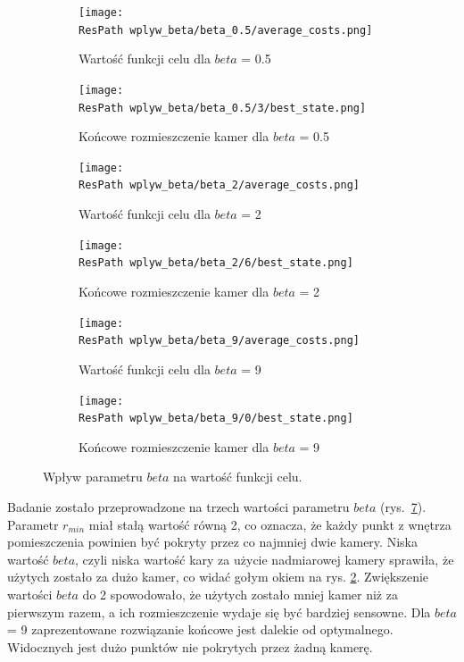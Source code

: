 \documentclass[12pt,a4paper]{article}
\newcommand{\ResPath}{../badania/}
\begin{document}
\afterpage{\clearpage}
\begin{figure}[p]
\captionsetup[subfigure]{aboveskip=-3pt,belowskip=-1pt}
  \begin{subfigure}[b]{0.5\linewidth}
    \centering
    \texttt{[image: \\ResPath wplyw\_beta/beta\_0.5/average\_costs.png]}
    \caption{Wartość funkcji celu dla $beta$ = 0.5} 
    \label{fig_beta:a} 
  \end{subfigure}%
  \begin{subfigure}[b]{0.5\linewidth}
    \centering
    \texttt{[image: \\ResPath wplyw\_beta/beta\_0.5/3/best\_state.png]}
    \caption{Końcowe rozmieszczenie kamer dla $beta$ = 0.5} 
    \label{fig_beta:b} 
  \end{subfigure}
  \begin{subfigure}[b]{0.5\linewidth}
    \centering
    \texttt{[image: \\ResPath wplyw\_beta/beta\_2/average\_costs.png]} 
    \caption{Wartość funkcji celu dla $beta$ = 2} 
    \label{fig_beta:c} 
  \end{subfigure}%
  \begin{subfigure}[b]{0.5\linewidth}
    \centering
    \texttt{[image: \\ResPath wplyw\_beta/beta\_2/6/best\_state.png]} 
    \caption{Końcowe rozmieszczenie kamer dla $beta$ = 2} 
    \label{fig_beta:d} 
  \end{subfigure}
    \begin{subfigure}[b]{0.5\linewidth}
    \centering
    \texttt{[image: \\ResPath wplyw\_beta/beta\_9/average\_costs.png]} 
    \caption{Wartość funkcji celu dla $beta$ = 9} 
    \label{fig_beta:c} 
  \end{subfigure}%
  \begin{subfigure}[b]{0.5\linewidth}
    \centering
    \texttt{[image: \\ResPath wplyw\_beta/beta\_9/0/best\_state.png]} 
    \caption{Końcowe rozmieszczenie kamer dla $beta$ = 9} 
    \label{fig_beta:d} 
  \end{subfigure} 
  \caption{Wpływ parametru $beta$ na wartość funkcji celu.}
  \label{fig_beta} 
\end{figure}
\restoregeometry
Badanie zostało przeprowadzone na trzech wartości parametru $beta$
(rys.\ \ref{fig_beta}). Parametr $r_{min}$ miał stałą wartość równą 2,
co oznacza, że każdy punkt z wnętrza pomieszczenia powinien być pokryty
przez co najmniej dwie kamery. Niska wartość $beta$, czyli niska wartość
kary za użycie nadmiarowej kamery sprawiła, że użytych zostało za dużo
kamer, co widać gołym okiem na rys. \ref{fig_beta:b}. Zwiększenie wartości
$beta$ do 2 spowodowało, że użytych zostało mniej kamer niż za pierwszym razem,
a ich rozmieszczenie wydaje się być bardziej sensowne. Dla $beta$ = 9 zaprezentowane
rozwiązanie końcowe jest dalekie od optymalnego. Widocznych jest dużo punktów
nie pokrytych przez żadną kamerę.
\end{document}
